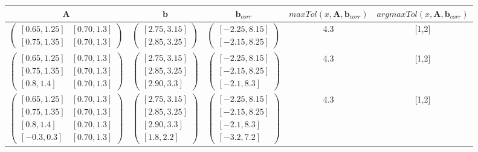 \documentclass[10pt]{article}
\begin{document}
\begin{enumerate}
\begin{center}
\begin{tabular}{|c|c|c|c|c|}
\hline
$\mathbf{A}$&$\mathbf{b}$&$\mathbf{b}_{corr}$&$max{Tol(x, \mathbf{A}, \mathbf{b}_{corr})}$& $argmax{Tol(x, \mathbf{A}, \mathbf{b}_{corr})}$\\
\hline
$\begin{pmatrix}
    [0.65, 1.25] & [0.70, 1.3] \\
    [0.75, 1.35] & [0.70, 1.3]
\end{pmatrix}$&$\begin{pmatrix}
    [2.75, 3.15] \\
    [2.85, 3.25]
\end{pmatrix}$&
$\begin{pmatrix}
    [-2.25, 8.15]\\
    [-2.15, 8.25]
\end{pmatrix}$
&4.3&[1,2]\\
\hline
$\begin{pmatrix}
    [0.65, 1.25] & [0.70, 1.3] \\
    [0.75, 1.35] & [0.70, 1.3] \\
    [0.8, 1.4] & [0.70, 1.3]
\end{pmatrix}$
&$\begin{pmatrix}
    [2.75, 3.15] \\
    [2.85, 3.25]\\
    [2.90, 3.3]
\end{pmatrix}$&
$\begin{pmatrix}
    [-2.25, 8.15]\\
    [-2.15, 8.25]\\
    [-2.1, 8.3]
\end{pmatrix}$
&4.3&[1,2]\\
\hline
$\begin{pmatrix}
    [0.65, 1.25] & [0.70, 1.3] \\
    [0.75, 1.35] & [0.70, 1.3] \\
    [0.8, 1.4] & [0.70, 1.3] \\
    [-0.3, 0.3] & [0.70, 1.3]
\end{pmatrix}$&$\begin{pmatrix}
    [2.75, 3.15] \\
    [2.85, 3.25]\\
    [2.90, 3.3] \\
    [1.8,2.2]
\end{pmatrix}$&
$\begin{pmatrix}
    [-2.25, 8.15]\\
    [-2.15, 8.25]\\
    [-2.1, 8.3]\\
    [-3.2, 7.2]
\end{pmatrix}$
&4.3&[1,2]\\
\hline
\end{tabular}
\end{center}


\end{enumerate}
\end{document}
